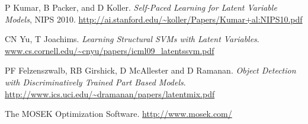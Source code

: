 \documentclass{article}
\begin{document}
 
\begin{thebibliography}{9}


 P Kumar, B Packer, and D Koller. \emph{Self-Paced Learning for Latent Variable Models},
NIPS 2010. \url{http://ai.stanford.edu/~koller/Papers/Kumar+al:NIPS10.pdf}

 CN Yu, T Joachims. \emph{Learning Structural SVMs with Latent Variables}. \url{www.cs.cornell.edu/~cnyu/papers/icml09_latentssvm.pdf}

 PF Felzenszwalb, RB Girshick, D McAllester and D Ramanan. \emph{Object Detection with Discriminatively Trained
Part Based Models}.  \url{http://www.ics.uci.edu/~dramanan/papers/latentmix.pdf}

 The MOSEK Optimization Software. \url{http://www.mosek.com/}

\end{thebibliography}
\end{document}
